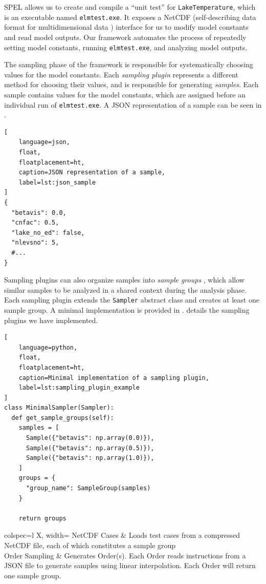 \documentclass[10pt,twocolumn]{article}
\newcommand{\term}[1]{%
    \emph{#1}%
}
\begin{document}
SPEL allows us to create and compile a ``unit test'' for \verb|LakeTemperature|, which is 
an executable named \verb|elmtest.exe|. It exposes a NetCDF (self-describing data format
for multidimensional data \cite{netcdf}) interface for us to modify model constants and 
read model outputs. Our framework automates the process of repeatedly setting 
model constants, running \verb|elmtest.exe|, and analyzing model outputs.

The sampling phase of the framework is responsible for systematically choosing values for 
the model constants. Each \term{sampling plugin} represents a different method for 
choosing their values, and is responsible for generating {\it samples}. Each sample
contains values for the model constants, which are assigned before an individual run of 
\verb|elmtest.exe|. A JSON representation of a sample can be seen in 
.

\begin{lstlisting}[
    language=json,
    float,
    floatplacement=ht,
    caption=JSON representation of a sample,
    label=lst:json_sample
]
{
  "betavis": 0.0,
  "cnfac": 0.5,
  "lake_no_ed": false,
  "nlevsno": 5,
  #...
}
\end{lstlisting}

Sampling plugins can also organize samples into \term{sample groups}, which allow similar 
samples to be analyzed in a shared context during the analysis phase. Each 
sampling plugin extends the \verb|Sampler| abstract class and creates at least one sample 
group. A minimal implementation is provided in .
 details the sampling plugins we have implemented.

\begin{lstlisting}[
    language=python,
    float,
    floatplacement=ht,
    caption=Minimal implementation of a sampling plugin,
    label=lst:sampling_plugin_example
]
class MinimalSampler(Sampler):
  def get_sample_groups(self):
    samples = [
      Sample({"betavis": np.array(0.0)}),
      Sample({"betavis": np.array(0.5)}),
      Sample({"betavis": np.array(1.0)}),
    ]
    groups = {
      "group_name": SampleGroup(samples)
    }

    return groups
\end{lstlisting}

\begin{table}[tb]
    \centering
    \footnotesize
    \caption{Currently supported sampling plugins}
    \label{tab:sampling_plugins}
    \begin{tblr}{
            colspec={l X},
            width=\columnwidth
        }
        \toprule
        NetCDF Cases
        & Loads test cases from a compressed NetCDF file, each of which constitutes a
        sample group \\
        \midrule
        Order Sampling
        & Generates Order(s). Each Order reads instructions from a JSON file to
        generate samples using linear interpolation. Each Order will return one sample 
        group. \\
        \bottomrule
    \end{tblr}
\end{table}
\end{document}
